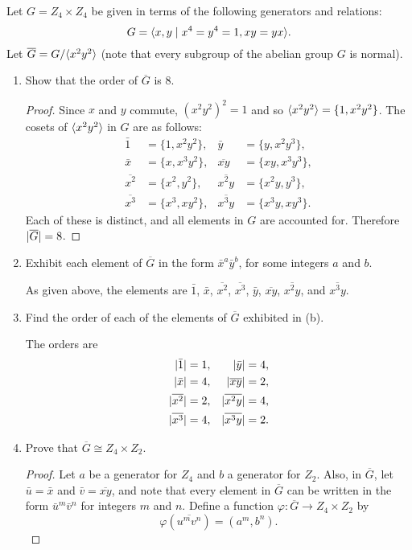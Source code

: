  Let $G = Z_4\times Z_4$ be given in terms of the
following generators and relations:
\begin{equation*}
  G = \langle{x,y \mid x^4 = y^4 = 1, xy = yx}\rangle.
\end{equation*}
Let $\overline{G} = G/\langle{x^2y^2}\rangle$ (note that every subgroup of the
abelian group $G$ is normal).
\begin{enumerate}
\item Show that the order of $\overline{G}$ is $8$.
  \begin{proof}
    Since $x$ and $y$ commute, $(x^2y^2)^2 = 1$ and so
    $\langle{x^2y^2}\rangle = \{1, x^2y^2\}$. The cosets of $\langle{x^2y^2}\rangle$ in
    $G$ are as follows:
    \begin{align*}
      \bar1 &= \{1, x^2y^2\},
      & \bar{y} &= \{y, x^2y^3\}, \\
      \bar{x} &= \{x, x^3y^2\},
      & \overline{xy} &= \{xy, x^3y^3\}, \\
      \overline{x^2} &= \{x^2, y^2\},
      & \overline{x^2y} &= \{x^2y, y^3\}, \\
      \overline{x^3} &= \{x^3, xy^2\},
      & \overline{x^3y} &= \{x^3y, xy^3\}.
    \end{align*}
    Each of these is distinct, and all elements in $G$ are accounted
    for. Therefore $\lvert{\overline{G}}\rvert = 8$.
  \end{proof}
\item Exhibit each element of $\overline{G}$ in the form
  $\bar{x}^a\bar{y}^b$, for some integers $a$ and $b$.
  \begin{solution}
    As given above, the elements are $\bar1$, $\bar{x}$,
    $\overline{x^2}$, $\overline{x^3}$, $\bar{y}$, $\overline{xy}$,
    $\overline{x^2y}$, and $\overline{x^3y}$.
  \end{solution}
\item Find the order of each of the elements of $\overline{G}$
  exhibited in (b).
  \begin{solution}
    The orders are
    \begin{align*}
      \lvert{\bar1}\rvert &= 1,
      & \lvert{\bar{y}}\rvert &= 4, \\
      \lvert{\bar{x}}\rvert &= 4,
      & \lvert{\overline{xy}}\rvert &= 2, \\
      \lvert{\overline{x^2}}\rvert &= 2,
      & \lvert{\overline{x^2y}}\rvert &= 4, \\
      \lvert{\overline{x^3}}\rvert &= 4,
      & \lvert{\overline{x^3y}}\rvert &= 2. \qedhere
    \end{align*}
  \end{solution}
\item Prove that $\overline{G} \cong Z_4\times Z_2$.
  \begin{proof}
    Let $a$ be a generator for $Z_4$ and $b$ a generator for
    $Z_2$. Also, in $\overline{G}$, let $\bar{u} = \bar{x}$ and
    $\bar{v} = \overline{xy}$, and note that every element in
    $\overline{G}$ can be written in the form $\bar{u}^m\bar{v}^n$ for
    integers $m$ and $n$. Define a function
    $\varphi\colon\overline{G}\to Z_4\times Z_2$ by
    \begin{equation*}
      \varphi(\overline{u^mv^n}) = (a^m, b^n).
    \end{equation*}


\end{proof}
\end{enumerate}
